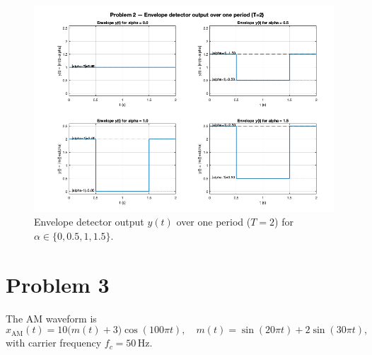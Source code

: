 \documentclass[12pt]{article}
\begin{document}
\begin{figure}[H]
  \centering
  \includegraphics[width=\textwidth]{question2_image.png}
  \caption{Envelope detector output $y(t)$ over one period ($T=2$) for $\alpha \in \{0,0.5,1,1.5\}$.}
\end{figure}

\section*{Problem 3}

The AM waveform is
\[
  x_{\text{AM}}(t) = 10\bigl(m(t) + 3\bigr)\cos(100\pi t),
\quad m(t) = \sin(20\pi t) + 2\sin(30\pi t),
\]
with carrier frequency $f_c = 50\,\text{Hz}$.
\end{document}
